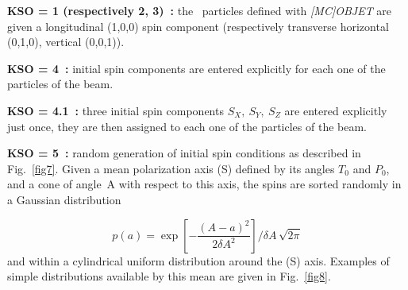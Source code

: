 \noindent\textbf{KSO = 1  (respectively 2, 3)~:} the \IMAX\ particles
 defined with \textsl{[MC]OBJET} are given a longitudinal (1,0,0) spin component (respectively 
transverse horizontal (0,1,0), vertical (0,0,1)).  
\medskip

\noindent\textbf{KSO = 4~:} initial spin components are entered explicitly for
each one of the \IMAX{} particles of the beam.  
\medskip

\noindent\textbf{KSO = 4.1~:} three initial spin components $S_X, ~S_Y, ~S_Z$ are entered explicitly just once, 
they are then assigned to  each one of the \IMAX{} particles of the beam.  
\medskip

\noindent\textbf{KSO = 5~:} random generation of \IMAX{} initial spin
conditions as described in Fig.~\ref{fig7}.  
Given a mean polarization axis (S) defined by its angles $ T_0 $ and $ P_0 $, 
and a cone of angle~A with respect to this axis, the \IMAX{} spins are sorted randomly in a 
Gaussian distribution

$$ p(a) = \exp \left[- \dfrac{(A-a)^2 }{ 2\delta A^2} \right]/ \delta A\,  \sqrt{2\pi}   $$
%
and within a cylindrical uniform distribution around the (S) 
axis. Examples of simple distributions available by this mean are 
given in Fig.~\ref{fig8}.  


